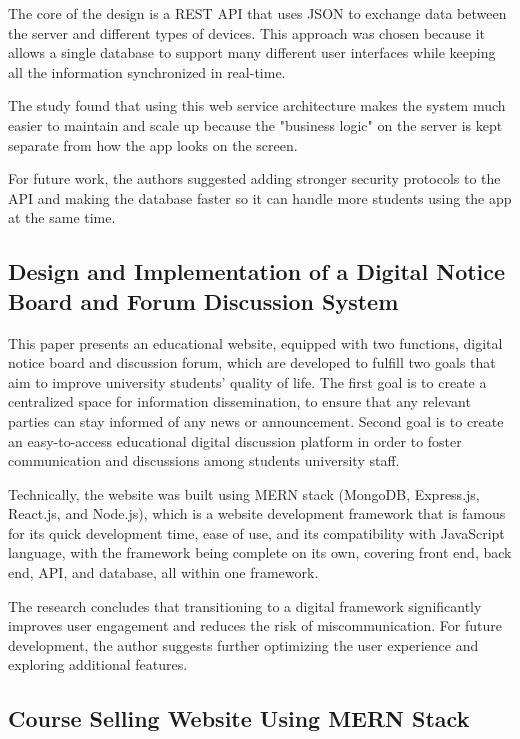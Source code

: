 The core of the design is a REST API that uses JSON to exchange data between the server and different types of devices. This approach was chosen because it allows a single database to support many different user interfaces while keeping all the information synchronized in real-time.

The study found that using this web service architecture makes the system much easier to maintain and scale up because the "business logic" on the server is kept separate from how the app looks on the screen.

For future work, the authors suggested adding stronger security protocols to the API and making the database faster so it can handle more students using the app at the same time.


\subsection{Design and Implementation of a Digital Notice Board and Forum Discussion System \cite{paper_11}}

This paper presents an educational website, equipped with two functions, digital notice board and discussion forum, which are developed to fulfill two goals that aim to improve university students' quality of life. The first goal is to create a centralized space for information dissemination, to ensure that any relevant parties can stay informed of any news or announcement. Second goal is to create an easy-to-access educational digital discussion platform in order to foster communication and discussions among students university staff. 

Technically, the website was built using MERN stack (MongoDB, Express.js, React.js, and Node.js), which is a website development framework that is famous for its quick development time, ease of use, and its compatibility with JavaScript language, with the framework being complete on its own, covering front end, back end, API, and database, all within one framework.

The research concludes that transitioning to a digital framework significantly improves user engagement and reduces the risk of miscommunication. For future development, the author suggests further optimizing the user experience and exploring additional features.

\subsection{Course Selling Website Using MERN Stack \cite{paper_12}}

